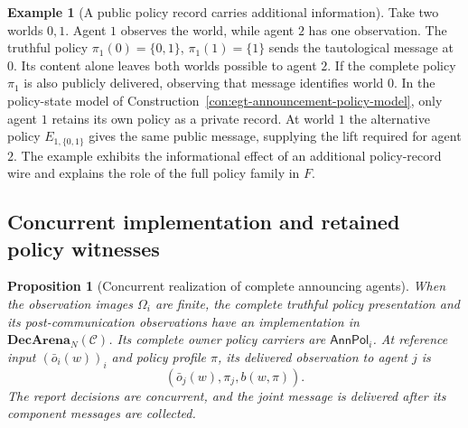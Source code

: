 \documentclass[11pt,a4paper]{article}
\numberwithin{equation}{section}
\newtheorem{proposition}[theorem]{Proposition}
\theoremstyle{definition}
\newtheorem{example}[theorem]{Example}
\theoremstyle{remark}
\theoremstyle{plain}
\begin{document}
\begin{example}[A public policy record carries additional information]
\label{ex:egt-public-policy-record}
Take two worlds $0,1$. Agent $1$ observes the world, while agent $2$ has one
observation. The truthful policy
$\pi_1(0)=\{0,1\}$, $\pi_1(1)=\{1\}$ sends the tautological message at
$0$. Its content alone leaves both worlds possible to agent $2$. If the
complete policy $\pi_1$ is also publicly delivered, observing that message
identifies world $0$. In the policy-state model of
Construction~\ref{con:egt-announcement-policy-model}, only agent $1$ retains
its own policy as a private record. At world $1$ the alternative policy
$E_{1,\{0,1\}}$ gives the same public message, supplying the lift required
for agent $2$. The example exhibits the informational effect of an additional
policy-record wire and explains the role of the full policy family in $F$.
\end{example}

\subsection{Concurrent implementation and retained policy witnesses}

\begin{proposition}[Concurrent realization of complete announcing agents]
\label{prop:egt-complete-announcement-realization}
\label{agt-prop-ann-implementation}
When the observation images $\Omega_i$ are finite, the complete truthful
policy presentation and its post-communication observations have an
implementation in $\mathbf{DecArena}_N(\mathcal C)$. Its complete owner
policy carriers are $\mathsf{AnnPol}_i$. At reference input
$(\bar o_i(w))_i$ and policy profile $\pi$, its delivered observation to
agent $j$ is
\[
 (\bar o_j(w),\pi_j,b(w,\pi)).
\]
The report decisions are concurrent, and the joint message is delivered
after its component messages are collected.
\end{proposition}
\end{document}
